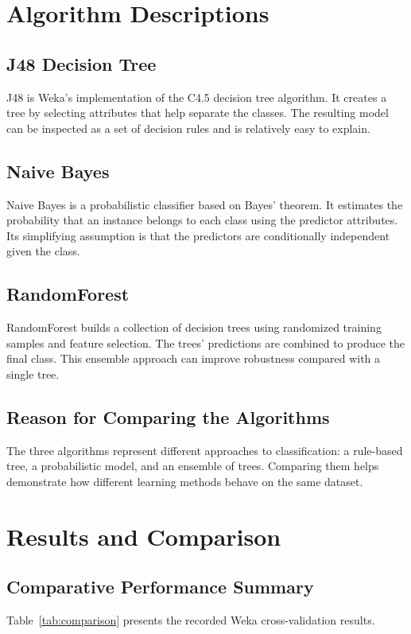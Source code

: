 \documentclass[11pt,a4paper]{article}
\begin{document}
\section{Algorithm Descriptions}
\subsection{J48 Decision Tree}
J48 is Weka's implementation of the C4.5 decision tree algorithm. It creates a tree by selecting attributes that help separate the classes. The resulting model can be inspected as a set of decision rules and is relatively easy to explain.

\subsection{Naive Bayes}
Naive Bayes is a probabilistic classifier based on Bayes' theorem. It estimates the probability that an instance belongs to each class using the predictor attributes. Its simplifying assumption is that the predictors are conditionally independent given the class.

\subsection{RandomForest}
RandomForest builds a collection of decision trees using randomized training samples and feature selection. The trees' predictions are combined to produce the final class. This ensemble approach can improve robustness compared with a single tree.

\subsection{Reason for Comparing the Algorithms}
The three algorithms represent different approaches to classification: a rule-based tree, a probabilistic model, and an ensemble of trees. Comparing them helps demonstrate how different learning methods behave on the same dataset.

\section{Results and Comparison}
\subsection{Comparative Performance Summary}
Table~\ref{tab:comparison} presents the recorded Weka cross-validation results.
\end{document}

